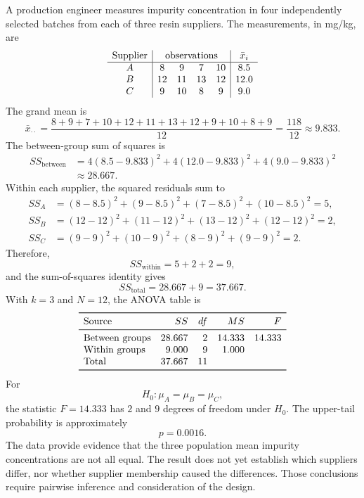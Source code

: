\begin{example}\par
A production engineer measures impurity concentration in four independently selected batches from each of three resin suppliers. The measurements, in mg/kg, are
\[
\begin{array}{c|cccc|c}
\text{Supplier} & \multicolumn{4}{c|}{\text{observations}} & \bar x_i\\
\hline
A & 8 & 9 & 7 & 10 & 8.5\\
B & 12 & 11 & 13 & 12 & 12.0\\
C & 9 & 10 & 8 & 9 & 9.0
\end{array}
\]
The grand mean is
\[
\bar x_{\cdot\cdot}
=\frac{8+9+7+10+12+11+13+12+9+10+8+9}{12}
=\frac{118}{12}
\approx9.833.
\]
The between-group sum of squares is
\[
\begin{aligned}
SS_{\text{between}}
&=4(8.5-9.833)^2
  +4(12.0-9.833)^2
  +4(9.0-9.833)^2\\
&\approx28.667.
\end{aligned}
\]
Within each supplier, the squared residuals sum to
\[
\begin{aligned}
SS_A&=(8-8.5)^2+(9-8.5)^2+(7-8.5)^2+(10-8.5)^2=5,\\
SS_B&=(12-12)^2+(11-12)^2+(13-12)^2+(12-12)^2=2,\\
SS_C&=(9-9)^2+(10-9)^2+(8-9)^2+(9-9)^2=2.
\end{aligned}
\]
Therefore,
\[
SS_{\text{within}}=5+2+2=9,
\]
and the sum-of-squares identity gives
\[
SS_{\text{total}}=28.667+9=37.667.
\]
With $k=3$ and $N=12$, the ANOVA table is
\[
\begin{array}{lrrrr}
\toprule
\text{Source} & SS & df & MS & F\\
\midrule
\text{Between groups} & 28.667 & 2 & 14.333 & 14.333\\
\text{Within groups}  &  9.000 & 9 &  1.000 & \\
\text{Total}          & 37.667 & 11 &       & \\
\bottomrule
\end{array}
\]
For
\[
H_0:\mu_A=\mu_B=\mu_C,
\]
the statistic $F=14.333$ has $2$ and $9$ degrees of freedom under $H_0$. The upper-tail probability is approximately
\[
p=0.0016.
\]
The data provide evidence that the three population mean impurity concentrations are not all equal. The result does not yet establish which suppliers differ, nor whether supplier membership caused the differences. Those conclusions require pairwise inference and consideration of the design.
\end{example}

